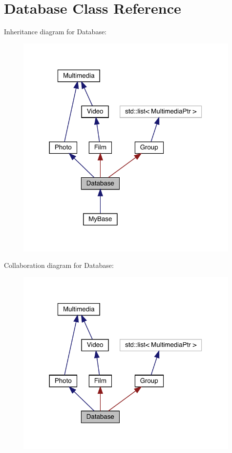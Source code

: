 \hypertarget{class_database}{}\section{Database Class Reference}
\label{class_database}


Inheritance diagram for Database\+:
\nopagebreak
\begin{figure}[H]
\begin{center}
\leavevmode
\includegraphics[width=314pt]{class_database__inherit__graph}
\end{center}
\end{figure}


Collaboration diagram for Database\+:
\nopagebreak
\begin{figure}[H]
\begin{center}
\leavevmode
\includegraphics[width=314pt]{class_database__coll__graph}
\end{center}
\end{figure}
